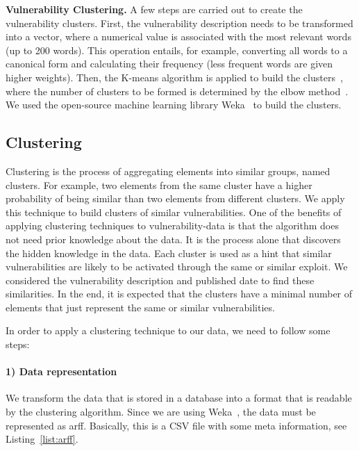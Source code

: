 \textbf{Vulnerability Clustering.}
A few steps are carried out to create the vulnerability clusters. 
First, the vulnerability description needs to be transformed into a vector, where a numerical value is associated with the most relevant words (up to 200 words). 
This operation entails, for example, converting all words to a canonical form and calculating their frequency (less frequent words are given higher weights).
Then, the K-means algorithm is applied to build the clusters~\cite{Jain:2010}, where the number of clusters to be formed is determined by the elbow method~\cite{Thorndike:1953}. 
We used the open-source machine learning library Weka~\cite{weka} to build the clusters. 


\subsection{Clustering}\label{sec:clustering}
Clustering is the process of aggregating elements into similar groups, named clusters. 
For example, two elements from the same cluster have a higher probability of being similar than two elements from different clusters. 
We apply this technique to build clusters of similar vulnerabilities.
One of the benefits of applying clustering techniques to vulnerability-data is that the algorithm does not need prior knowledge about the data.
It is the process alone that discovers the hidden knowledge in the data.
Each cluster is used as a hint that similar vulnerabilities are likely to be activated through the same or similar exploit.
We considered the vulnerability description and published date to find these similarities. 
In the end, it is expected that the clusters have a minimal number of elements that just represent the same or similar vulnerabilities.


In order to apply a clustering technique to our data, we need to follow some steps:

\paragraph{1) Data representation}
We transform the data that is stored in a database into a format that is readable by the clustering algorithm. 
Since we are using Weka~\cite{weka}, the data must be represented as \gls{arff}. 
Basically, this is a CSV file with some meta information, see Listing~\ref{list:arff}.

